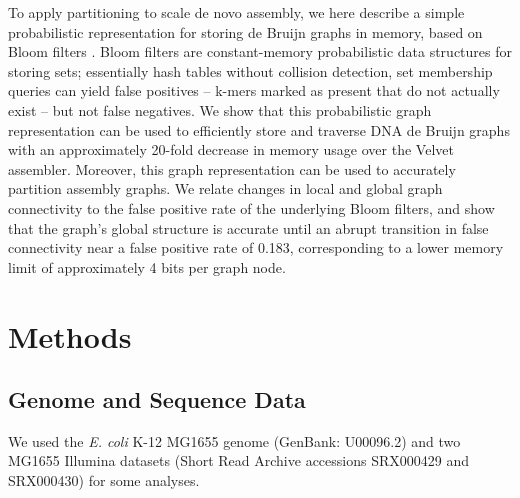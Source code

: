 \documentclass[12pt]{article} \usepackage{simplemargins}
\begin{document}
To apply partitioning to scale de novo assembly, we here describe a
simple probabilistic representation for storing de Bruijn graphs in
memory, based on Bloom filters \cite{bloom}.  Bloom filters are
constant-memory probabilistic data structures for storing sets;
essentially hash tables without collision detection, set membership
queries can yield false positives -- k-mers marked as present that do
not actually exist -- but not false negatives.  We show that this
probabilistic graph representation can be used to efficiently store
and traverse DNA de Bruijn graphs with an approximately 20-fold
decrease in memory usage over the Velvet assembler. Moreover, this
graph representation can be used to accurately partition assembly
graphs.  We relate changes in local and global graph connectivity to
the false positive rate of the underlying Bloom filters, and show that
the graph's global structure is accurate until an abrupt transition in
false connectivity near a false positive rate of 0.183, corresponding
to a lower memory limit of approximately 4 bits per graph node.


\section{Methods}

\subsection{Genome and Sequence Data}
We used the \emph{E. coli} K-12 MG1655 genome (GenBank: U00096.2) and two MG1655 Illumina 
datasets (Short Read Archive accessions SRX000429 and SRX000430) for some
analyses. 
\end{document}
